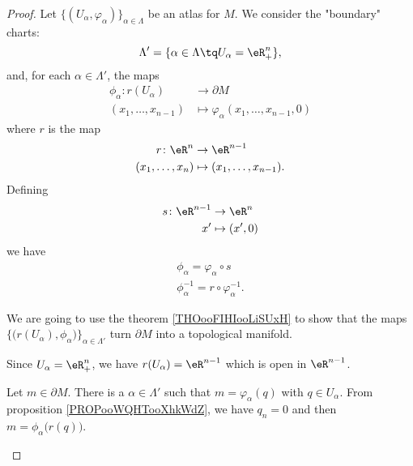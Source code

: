 \begin{proof}
	Let \( \{ (U_{\alpha}, \varphi_{\alpha}) \}_{\alpha\in \Lambda}\) be an atlas for \( M\). We consider the "boundary" charts:
	\begin{equation}
		\Lambda'=\{ \alpha\in\Lambda\tq U_{\alpha}=\eR^n_+ \},
	\end{equation}
	and, for each \( \alpha\in \Lambda'\), the maps
	\begin{equation}
		\begin{aligned}
			\phi_{\alpha}\colon r(U_{\alpha}) & \to \partial M                                 \\
			(x_1,\ldots,x_{n-1})              & \mapsto \varphi_{\alpha}(x_1,\ldots,x_{n-1},0)
		\end{aligned}
	\end{equation}
	where \( r\) is the map
	\begin{equation}
		\begin{aligned}
			r\colon \eR^n    & \to \eR^{n-1}                 \\
			(x_1,\ldots,x_n) & \mapsto (x_1,\ldots,x_{n-1}).
		\end{aligned}
	\end{equation}
	Defining
	\begin{equation}
		\begin{aligned}
			s\colon \eR^{n-1} & \to \eR^n      \\
			x'                & \mapsto (x',0)
		\end{aligned}
	\end{equation}
	we have
	\begin{subequations}		\label{SUBEQSooMASYooFfkvRT}
		\begin{align}
			\phi_{\alpha}=\varphi_{\alpha}\circ s \\
			\phi_{\alpha}^{-1}=r\circ\varphi_{\alpha}^{-1}.
		\end{align}
	\end{subequations}


	We are going to use the theorem \ref{THOooFIHIooLiSUxH} to show that the maps \( \{ \big( r(U_{\alpha}), \phi_{\alpha} \big) \}_{\alpha\in \Lambda'}\) turn \( \partial M\) into a topological manifold.
	\begin{subproof}
		Since \( U_{\alpha}=\eR^{n}_+\), we have \( r(U_{\alpha})=\eR^{n-1}\) which is open in \( \eR^{n-1}\).

		Let \( m\in \partial M\). There is a \( \alpha\in \Lambda'\) such that \( m=\varphi_{\alpha}(q)\) with \( q\in U_{\alpha}\). From proposition \ref{PROPooWQHTooXhkWdZ}, we have \( q_n=0\) and then \( m=\phi_{\alpha}\big( r(q) \big)\).


\end{subproof}
\end{proof}

